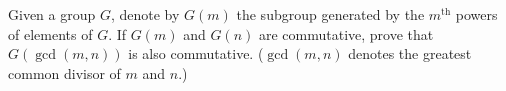 \documentclass{article}
\begin{document}
\setlength{\parindent}{0pt}
Given a group $G$, denote by $G(m)$ the subgroup generated by the $m^{\text{th}}$ powers of elements of $G$. If $G(m)$ and $G(n)$ are commutative, prove that $G(\gcd(m,n))$ is also commutative.\newline
($\gcd(m,n)$ denotes the greatest common divisor of $m$ and $n$.)
\end{document}
